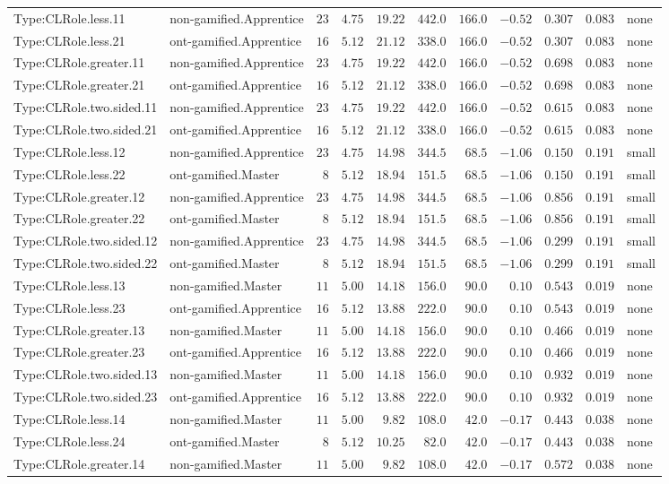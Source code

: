 \documentclass[6pt,a4paper]{article}
\begin{document}
{\begin{longtable}{llrrrrrrrrl}
Type:CLRole.less.11&non-gamified.Apprentice&$23$&$4.75$&$19.22$&$442.0$&$166.0$&$-0.52$&$0.307$&$0.083$&none\tabularnewline
Type:CLRole.less.21&ont-gamified.Apprentice&$16$&$5.12$&$21.12$&$338.0$&$166.0$&$-0.52$&$0.307$&$0.083$&none\tabularnewline
Type:CLRole.greater.11&non-gamified.Apprentice&$23$&$4.75$&$19.22$&$442.0$&$166.0$&$-0.52$&$0.698$&$0.083$&none\tabularnewline
Type:CLRole.greater.21&ont-gamified.Apprentice&$16$&$5.12$&$21.12$&$338.0$&$166.0$&$-0.52$&$0.698$&$0.083$&none\tabularnewline
Type:CLRole.two.sided.11&non-gamified.Apprentice&$23$&$4.75$&$19.22$&$442.0$&$166.0$&$-0.52$&$0.615$&$0.083$&none\tabularnewline
Type:CLRole.two.sided.21&ont-gamified.Apprentice&$16$&$5.12$&$21.12$&$338.0$&$166.0$&$-0.52$&$0.615$&$0.083$&none\tabularnewline
Type:CLRole.less.12&non-gamified.Apprentice&$23$&$4.75$&$14.98$&$344.5$&$ 68.5$&$-1.06$&$0.150$&$0.191$&small\tabularnewline
Type:CLRole.less.22&ont-gamified.Master&$ 8$&$5.12$&$18.94$&$151.5$&$ 68.5$&$-1.06$&$0.150$&$0.191$&small\tabularnewline
Type:CLRole.greater.12&non-gamified.Apprentice&$23$&$4.75$&$14.98$&$344.5$&$ 68.5$&$-1.06$&$0.856$&$0.191$&small\tabularnewline
Type:CLRole.greater.22&ont-gamified.Master&$ 8$&$5.12$&$18.94$&$151.5$&$ 68.5$&$-1.06$&$0.856$&$0.191$&small\tabularnewline
Type:CLRole.two.sided.12&non-gamified.Apprentice&$23$&$4.75$&$14.98$&$344.5$&$ 68.5$&$-1.06$&$0.299$&$0.191$&small\tabularnewline
Type:CLRole.two.sided.22&ont-gamified.Master&$ 8$&$5.12$&$18.94$&$151.5$&$ 68.5$&$-1.06$&$0.299$&$0.191$&small\tabularnewline
Type:CLRole.less.13&non-gamified.Master&$11$&$5.00$&$14.18$&$156.0$&$ 90.0$&$ 0.10$&$0.543$&$0.019$&none\tabularnewline
Type:CLRole.less.23&ont-gamified.Apprentice&$16$&$5.12$&$13.88$&$222.0$&$ 90.0$&$ 0.10$&$0.543$&$0.019$&none\tabularnewline
Type:CLRole.greater.13&non-gamified.Master&$11$&$5.00$&$14.18$&$156.0$&$ 90.0$&$ 0.10$&$0.466$&$0.019$&none\tabularnewline
Type:CLRole.greater.23&ont-gamified.Apprentice&$16$&$5.12$&$13.88$&$222.0$&$ 90.0$&$ 0.10$&$0.466$&$0.019$&none\tabularnewline
Type:CLRole.two.sided.13&non-gamified.Master&$11$&$5.00$&$14.18$&$156.0$&$ 90.0$&$ 0.10$&$0.932$&$0.019$&none\tabularnewline
Type:CLRole.two.sided.23&ont-gamified.Apprentice&$16$&$5.12$&$13.88$&$222.0$&$ 90.0$&$ 0.10$&$0.932$&$0.019$&none\tabularnewline
Type:CLRole.less.14&non-gamified.Master&$11$&$5.00$&$ 9.82$&$108.0$&$ 42.0$&$-0.17$&$0.443$&$0.038$&none\tabularnewline
Type:CLRole.less.24&ont-gamified.Master&$ 8$&$5.12$&$10.25$&$ 82.0$&$ 42.0$&$-0.17$&$0.443$&$0.038$&none\tabularnewline
Type:CLRole.greater.14&non-gamified.Master&$11$&$5.00$&$ 9.82$&$108.0$&$ 42.0$&$-0.17$&$0.572$&$0.038$&none\tabularnewline

\end{longtable}}
\end{document}
